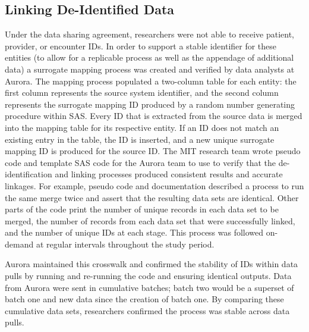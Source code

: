 \hypertarget{linking-de-identified-data}{%
\subsection{Linking De-Identified Data}\label{linking-de-identified-data}}

Under the data sharing agreement, researchers were not able to receive patient, provider, or encounter IDs. In order to support a stable identifier for these entities (to allow for a replicable process as well as the appendage of additional data) a surrogate mapping process was created and verified by data analysts at Aurora. The mapping process populated a two-column table for each entity: the first column represents the source system identifier, and the second column represents the surrogate mapping ID produced by a random number generating procedure within SAS. Every ID that is extracted from the source data is merged into the mapping table for its respective entity. If an ID does not match an existing entry in the table, the ID is inserted, and a new unique surrogate mapping ID is produced for the source ID. The MIT research team wrote pseudo code and template SAS code for the Aurora team to use to verify that the de-identification and linking processes produced consistent results and accurate linkages. For example, pseudo code and documentation described a process to run the same merge twice and assert that the resulting data sets are identical. Other parts of the code print the number of unique records in each data set to be merged, the number of records from each data set that were successfully linked, and the number of unique IDs at each stage. This process was followed on-demand at regular intervals throughout the study period.

Aurora maintained this crosswalk and confirmed the stability of IDs within data pulls by running and re-running the code and ensuring identical outputs. Data from Aurora were sent in cumulative batches; batch two would be a superset of batch one and new data since the creation of batch one. By comparing these cumulative data sets, researchers confirmed the process was stable across data pulls.

